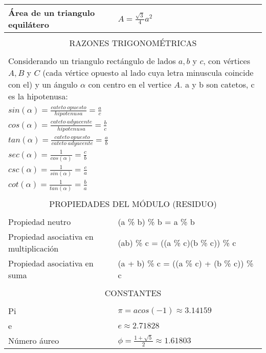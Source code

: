 \begin{center}
\begin{longtable}{|p{3cm}|p{9cm}|}
Área de un triangulo equilátero & $A = \frac{\sqrt{3}}{4}a^{2}$ \\ \hline
\multicolumn{2}{|c|}{} \\
\multicolumn{2}{|c|}{RAZONES TRIGONOMÉTRICAS} \\
\multicolumn{2}{|c|}{} \\ \hline
\multicolumn{2}{|p{12cm}|}{Considerando un triangulo rectángulo de lados $a, b$ y $c$, con vértices $A, B$ y $C$ (cada vértice opuesto al lado cuya letra minuscula coincide con el) y un ángulo $\alpha$ con centro en el vertice $A$. a y b son catetos, c es la hipotenusa:}
\\ \hline
\multicolumn{2}{|p{12cm}|}{
$sin(\alpha) = \frac{cateto\ opuesto}{hipotenusa} = \frac{a}{c}$ } \\ \hline
\multicolumn{2}{|p{12cm}|}{
$cos(\alpha) = \frac{cateto\ adyacente}{hipotenusa} = \frac{b}{c}$ } \\ \hline
\multicolumn{2}{|p{12cm}|}{
$tan(\alpha) = \frac{cateto\ opuesto}{cateto\ adyacente} = \frac{a}{b}$ } \\ \hline
\multicolumn{2}{|p{12cm}|}{
$sec(\alpha) = \frac{1}{cos(\alpha)} = \frac{c}{b}$ } \\ \hline
\multicolumn{2}{|p{12cm}|}{
$csc(\alpha) = \frac{1}{sin(\alpha)} = \frac{c}{a}$ } \\ \hline
\multicolumn{2}{|p{12cm}|}{
$cot(\alpha) = \frac{1}{tan(\alpha)} = \frac{b}{a}$ } \\ \hline
\multicolumn{2}{|c|}{} \\
\multicolumn{2}{|c|}{PROPIEDADES DEL MÓDULO (RESIDUO)} \\
\multicolumn{2}{|c|}{} \\ \hline
Propiedad neutro & (a \% b) \% b = a \% b \\ \hline
Propiedad asociativa en multiplicación &  (ab) \% c = ((a \% c)(b \% c)) \% c \\ \hline
Propiedad asociativa en suma & (a + b) \% c = ((a \% c) + (b \% c)) \% c \\ \hline
\multicolumn{2}{|c|}{} \\
\multicolumn{2}{|c|}{CONSTANTES} \\
\multicolumn{2}{|c|}{} \\ \hline
Pi & $\pi = acos(-1) \approx 3.14159$ \\ \hline
e & $e \approx 2.71828$ \\ \hline
Número áureo & $\phi = \frac{1 + \sqrt{5}}{2} \approx 1.61803$ \\ \hline


\end{longtable}
\end{center}